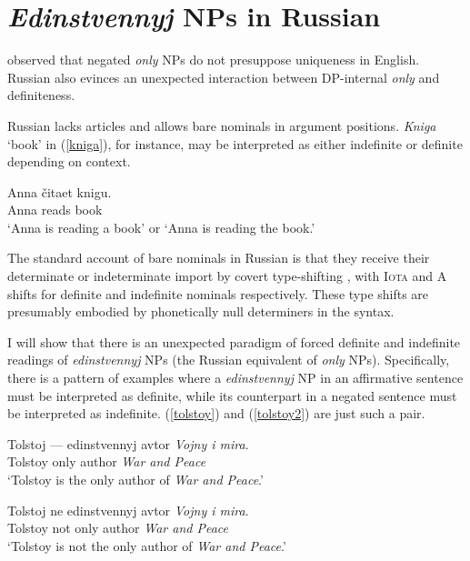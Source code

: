 \section{\textit{Edinstvennyj} NPs in Russian \label{sec:only-nps-russian}}
\citet{cb2015} observed that negated \textit{only} NPs do not presuppose uniqueness in English. Russian also evinces an unexpected interaction between DP-internal \textit{only} and definiteness.


Russian lacks articles and allows bare nominals in argument positions. \textit{Kniga} `book' in (\ref{kniga}), for instance, may be interpreted as either indefinite or definite depending on context.

\begin{exe}
	\ex \label{kniga} \gll Anna \v{c}itaet knigu.\\
	Anna reads book\\
	\glt `Anna is reading a book' or `Anna is reading the book.'
\end{exe}

The standard account of bare nominals in Russian is that they receive their determinate or indeterminate import by covert type-shifting \citep{chierchia98}, with  \textsc{Iota} and \textsc{A} shifts for definite and indefinite nominals respectively. These type shifts are presumably embodied by phonetically null determiners in the syntax.

I will show that there is an unexpected paradigm of forced definite and indefinite readings of \textit{edinstvennyj} NPs (the Russian equivalent of \textit{only} NPs). Specifically, there is a pattern of examples where a \textit{edinstvennyj} NP in an affirmative sentence must be interpreted as definite, while its counterpart in a negated sentence must be interpreted as indefinite. (\ref{tolstoy}) and (\ref{tolstoy2}) are just such a pair.

\begin{exe}
	\ex \label{tolstoy} \gll Tolstoj --- edinstvennyj avtor \textit{Vojny i mira}.\\
	Tolstoy {} only author \textit{War and Peace}\\
	\glt `Tolstoy is the only author of \textit{War and Peace}.'

	\ex \label{tolstoy2} \gll Tolstoj ne edinstvennyj avtor \textit{Vojny i mira}.\\
	Tolstoy not only author \textit{War and Peace}\\
	\glt `Tolstoy is not the only author of \textit{War and Peace}.'
\end{exe}

